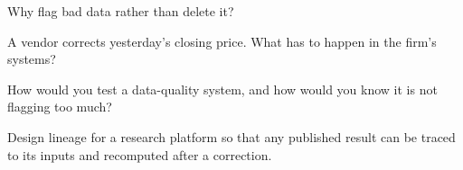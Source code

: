 \begin{interviewq}\label{iq:pl:data-quality-and-lineage:3}
Why flag bad data rather than delete it?
\end{interviewq}

\begin{interviewq}\label{iq:pl:data-quality-and-lineage:4}
A vendor corrects yesterday's closing price. What has to happen in the firm's systems?
\end{interviewq}

\begin{interviewq}\label{iq:pl:data-quality-and-lineage:5}
How would you test a data-quality system, and how would you know it is not flagging too much?
\end{interviewq}

\begin{interviewq}\label{iq:pl:data-quality-and-lineage:6}
Design lineage for a research platform so that any published result can be traced to its inputs and recomputed after a correction.
\end{interviewq}

